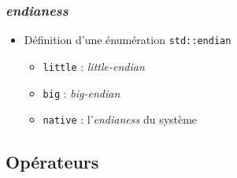 \documentclass[C++.tex]{subfiles}
\begin{document}
\begin{frame}[fragile]
	\frametitle{\textit{endianess}}
	\begin{itemize}
		\item Définition d'une énumération \lstinline|std::endian|
		\begin{itemize}
			\item \lstinline|little| : \textit{little-endian}
			\item \lstinline|big| : \textit{big-endian}
			\item \lstinline|native| : l'\textit{endianess} du système
		\end{itemize}
	\end{itemize}
\end{frame}

\subsection*{Opérateurs}
\end{document}
